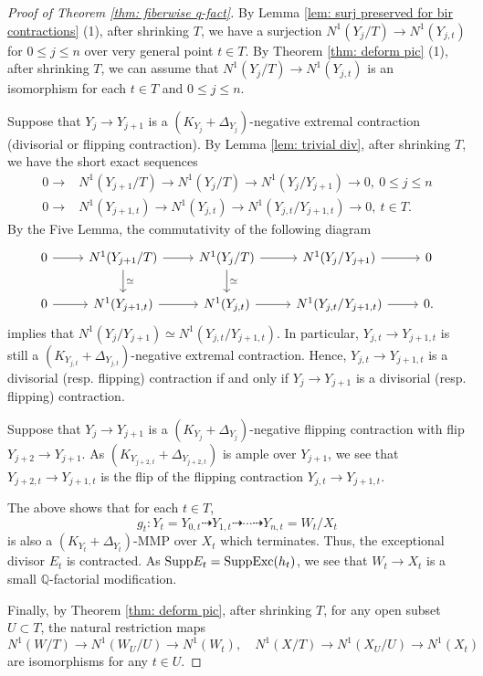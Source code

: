 \documentclass[11pt,oneside,reqno]{amsart}
\numberwithin{equation}{section}
\theoremstyle{definition}
\newcommand{\Exc}{{\rm {Exc}}}
\newcommand{\Supp}{{\rm {Supp}}}
\newcommand{\dto}{\dashrightarrow}
\newcommand{\bQ}{\mathbb{Q}}
\begin{document}
\begin{proof}[Proof of Theorem \ref{thm: fiberwise q-fact}]
By Lemma \ref{lem: surj preserved for bir contractions} (1), after shrinking $T$, we have a surjection $N^1(Y_j/T) \to N^1(Y_{j,t})$ for $0 \leq j \leq n$ over very general point $t\in T$. By Theorem \ref{thm: deform pic} (1), after shrinking $T$, we can assume that $N^1(Y_j/T) \to N^1(Y_{j, t})$ is an isomorphism for each $t\in T$ and $0 \leq j \leq n$. 

Suppose that $Y_j \to Y_{j+1}$ is a $(K_{Y_j}+\Delta_{Y_j})$-negative extremal contraction (divisorial or flipping contraction). By Lemma \ref{lem: trivial div}, after shrinking $T$, we have the short exact sequences
\[
\begin{split}
0 \to &N^1(Y_{j+1}/T) \to N^1(Y_j/T) \to N^1(Y_j/Y_{j+1}) \to 0, ~ 0 \leq j \leq n\\
    0 \to &N^1(Y_{j+1, t}) \to N^1(Y_{j,t}) \to N^1(Y_{j,t}/Y_{j+1, t}) \to 0,~t\in T.
\end{split}
\] By the Five Lemma, the commutativity of the following diagram 
\[
\begin{tikzcd}
	0\arrow[r] & N^1(Y_{j+1}/T) \arrow[d, "\simeq"] \arrow[r] &N^1(Y_j/T)\arrow[r] \arrow[d, "\simeq"]& N^1(Y_j/Y_{j+1}) \arrow[r] & 0 \\
	 0\arrow[r] & N^1(Y_{j+1, t}) \arrow[r] &N^1(Y_{j,t})\arrow[r] & N^1(Y_{j,t}/Y_{j+1,t}) \arrow[r] & 0.
	\end{tikzcd}
\] implies that $N^1(Y_j/Y_{j+1}) \simeq N^1(Y_{j,t}/Y_{j+1,t})$. In particular, $Y_{j,t} \to Y_{j+1,t}$ is still a $(K_{Y_{j,t}}+\Delta_{Y_{j,t}})$-negative extremal contraction. Hence, $Y_{j,t} \to Y_{j+1,t}$ is a divisorial (resp. flipping) contraction if and only if $Y_{j} \to Y_{j+1}$ is a divisorial (resp. flipping) contraction. 

Suppose that $Y_j \to Y_{j+1}$ is a $(K_{Y_j}+\Delta_{Y_j})$-negative flipping contraction with flip $Y_{j+2} \to Y_{j+1}$. As $(K_{Y_{j+2,t}}+\Delta_{Y_{j+2,t}})$ is ample over $Y_{j+1}$, we see that $Y_{j+2,t} \to Y_{j+1,t}$ is the flip of the flipping contraction $Y_{j,t} \to Y_{j+1,t}$.

The above shows that for each $t\in T$, 
\[
g_t: Y_t=Y_{0,t} \dto Y_{1,t} \dto \cdots \dto Y_{n,t}=W_t /X_t
\] is also a $(K_{Y_t}+\Delta_{Y_t})$-MMP over $X_t$ which terminates. Thus, the exceptional divisor $E_t$ is contracted. As $\Supp E_t = \Supp \Exc(h_t)$, we see that $W_t \to X_t$ is a small $\bQ$-factorial modification.

Finally, by Theorem \ref{thm: deform pic}, after shrinking $T$, for any open subset $U\subset T$, the natural restriction maps
\[
    N^1(W/T) \to N^1(W_U/U) \to N^1(W_t), \quad N^1(X/T) \to N^1(X_U/U) \to N^1(X_t)
\] are isomorphisms for any $t\in U$.
\end{proof}
\end{document}
